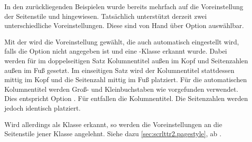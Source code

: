 \begin{Declaration}
\end{Declaration}
%
%
In den zurückliegenden Beispielen wurde bereits mehrfach auf die
Voreinstellung der Seitenstile
 und
%
 hingewiesen. Tatsächlich unterstützt
 derzeit zwei unterschiedliche
Voreinstellungen. Diese sind von Hand über Option 
auswählbar.

Mit der 
 wird
die Voreinstellung gewählt, die auch automatisch eingestellt wird, falls die
Option nicht angegeben ist und eine \KOMAScript-Klasse erkannt wurde. Dabei
werden für  im doppelseitigen Satz
Kolumnentitel außen im Kopf und Seitenzahlen außen im Fuß gesetzt. Im
einseitigen Satz wird der Kolumnentitel stattdessen mittig im Kopf und die
Seitenzahl mittig im Fuß platziert. Für die automatischen Kolumnentitel werden
Groß- und Kleinbuchstaben wie vorgefunden verwendet. Dies entspricht Option
%
. Für
 entfallen die
Kolumnentitel. Die Seitenzahlen werden jedoch identisch platziert.

Wird allerdings \hyperref[cha:scrlttr2]{}%
%
 als Klasse erkannt, so werden die Voreinstellungen an
die Seitenstile jener Klasse angelehnt. Siehe dazu
\autoref{sec:scrlttr2.pagestyle}, ab .

